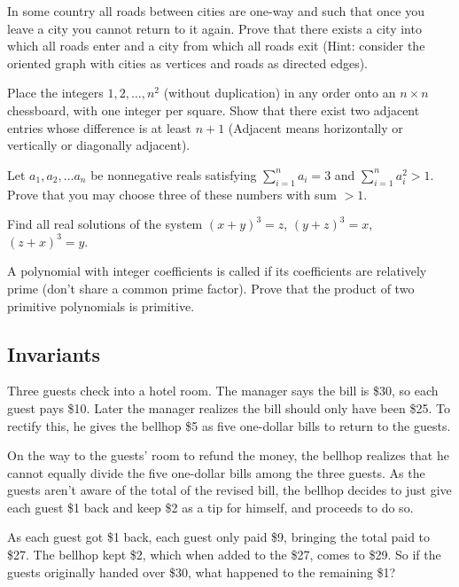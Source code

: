 \documentclass[12pt]{article}
\begin{document}
        \begin{exercise}
            In some country all roads between cities are one-way and such that once you leave a city you cannot return to it again. Prove that there exists a city into which all roads enter and a city from which all roads exit (Hint: consider the oriented graph with cities as vertices and roads as directed edges).  
        \end{exercise}
        
        \begin{exercise}
            Place the integers $1, 2, \ldots, n^2$ (without duplication) in any order onto an $n \times n$ chessboard, with one integer per square. Show that there exist two adjacent entries whose difference is at least $n + 1$ (Adjacent means horizontally or vertically or diagonally adjacent). 
        \end{exercise}
        
        \begin{exercise}
            Let $a_{1}, a_{2}, \ldots a_{n}$ be nonnegative reals satisfying $\sum_{i = 1}^{n} a_{i} = 3$ and $\sum_{i = 1}^{n} a_{i}^{2} > 1$. Prove that you may choose three of these numbers with sum $> 1$.
        \end{exercise}
        
        \begin{exercise}
            Find all real solutions of the system $(x + y)^{3} = z$, $(y + z)^{3} = x$, $(z + x)^{3} = y$. 
        \end{exercise}
        
        \begin{exercise}
        A polynomial with integer coefficients is called  if its coefficients are relatively prime (don't share a common prime factor). Prove that the product of two primitive polynomials is primitive.
        \end{exercise}

    \subsection{Invariants}

        \begin{exercise}
            Three guests check into a hotel room. The manager says the bill is \$30, so each guest pays \$10. Later the manager realizes the bill should only have been \$25. To rectify this, he gives the bellhop \$5 as five one-dollar bills to return to the guests.

            On the way to the guests' room to refund the money, the bellhop realizes that he cannot equally divide the five one-dollar bills among the three guests. As the guests aren't aware of the total of the revised bill, the bellhop decides to just give each guest \$1 back and keep \$2 as a tip for himself, and proceeds to do so.

            As each guest got \$1 back, each guest only paid \$9, bringing the total paid to \$27. The bellhop kept \$2, which when added to the \$27, comes to \$29. So if the guests originally handed over \$30, what happened to the remaining \$1?
        \end{exercise}
\end{document}
